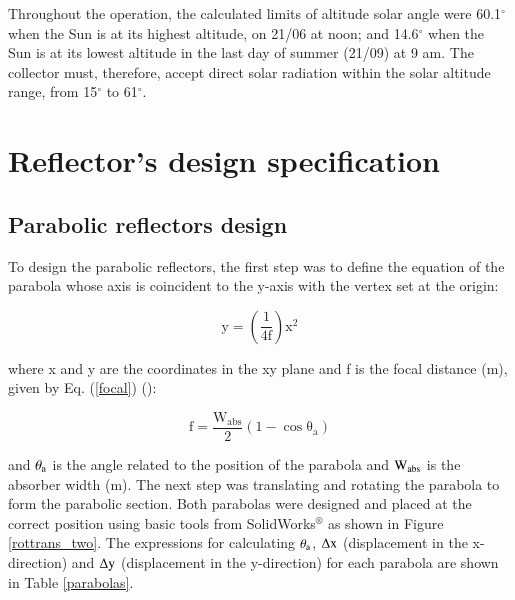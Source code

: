 
Throughout the operation, the calculated limits of altitude solar angle were 60.1$^{\circ}$ when the Sun is at its highest altitude, on 21/06 at noon; and 14.6$^{\circ}$ when the Sun is at its lowest altitude in the last day of summer (21/09) at 9 am. The collector must, therefore, accept direct solar radiation within the solar altitude range, from 15$^{\circ}$ to 61$^{\circ}$.

\section{Reflector's design specification}



\subsection{Parabolic reflectors design}

To design the parabolic reflectors, the first step was to define the equation of the parabola whose axis is coincident to the y-axis with the vertex set at the origin:

\begin{equation}
\mathrm{{y} = \left( {\frac{1}{{4f}}} \right){x}^2}
\label{parabola}
\end{equation}

\noindent where x and y are the coordinates in the xy plane and f is the focal distance (m), given by Eq. (\ref{focal}) (\cite{Winston2005}):

\begin{equation}
\mathrm{f = \frac{{{W_{abs}}}}{2}\left( {1 - \cos {\theta_{a}}} \right)}
\label{focal}
\end{equation}

\noindent and $\rm{\theta_{a}}$ is the angle related to the position of the parabola and ${\rm W_{abs}}$ is the absorber width (m). The next step was translating and rotating the parabola to form the parabolic section. Both parabolas were designed and placed at the correct position using basic tools from SolidWorks$^{\circledR}$ as shown in Figure \ref{rottrans_two}. The expressions for calculating $\rm{\theta_{a}}$, $\rm{\Delta x}$ (displacement in the x-direction) and $\rm{\Delta y}$ (displacement in the y-direction) for each parabola are shown in Table \ref{parabolas}.

